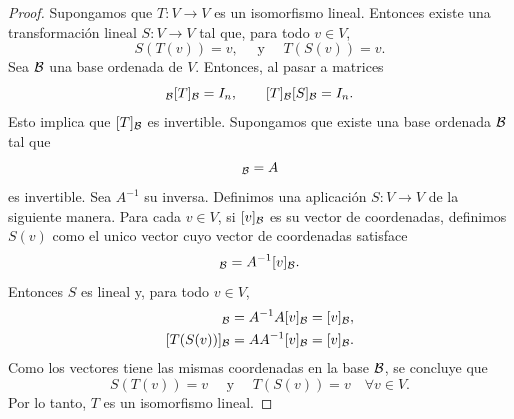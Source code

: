 \documentclass[12pt,a4paper]{article}
\begin{document}
    \begin{proof}
        Supongamos que $T:V\to V$ es un isomorfismo lineal. Entonces existe una transformación
        lineal $S:V\to V$ tal que, para todo $v\in V$,
        \begin{equation*}
            S(T(v))=v,\quad\text{ y }\quad T(S(v))=v.
        \end{equation*}
        Sea $\mathcal{B}$ una base ordenada de $V$. Entonces, al pasar a matrices
        \begin{equation*}
            [S]_{\BB}[T]_{\BB}=I_{n},\qquad [T]_{\BB}[S]_{\BB}=I_{n}.
        \end{equation*}
        Esto implica que $[T]_{\mathcal{B}}$ es invertible. Supongamos que existe una base ordenada $\mathcal{B}$ tal que
        \begin{equation*}
            [T]_{\BB}=A
        \end{equation*}
        es invertible. Sea $A^{-1}$ su inversa. Definimos una aplicación $S:V\to V$ de la siguiente manera.
        Para cada $v\in V$, si $[v]_{\mathcal{B}}$ es su vector de coordenadas, definimos $S(v)$ como el unico vector
        cuyo vector de coordenadas satisface
        \begin{equation*}
            [S(v)]_{\BB}=A^{-1}[v]_{\BB}.
        \end{equation*}
        Entonces $S$ es lineal y, para todo $v\in V$,
        \begin{align*}
            [S(T(v))]_{\BB}=A^{-1}A[v]_{\BB}=[v]_{\BB},\\
            [T(S(v))]_{\BB}=AA^{-1}[v]_{\BB}=[v]_{\BB}.
        \end{align*}
        Como los vectores tiene las mismas coordenadas en la base $\mathcal{B}$, se concluye que
        \begin{equation*}
            S(T(v))=v\quad\text{ y }\quad T(S(v))=v\quad \forall v\in V.
        \end{equation*}
        Por lo tanto, $T$ es un isomorfismo lineal.
    \end{proof}
\end{document}

